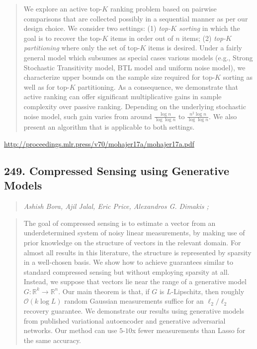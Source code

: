 \documentclass{article}
\begin{document}
\begin{quote}
    We explore an active top-$K$ ranking problem based on pairwise comparisons that are collected possibly in a sequential manner as per our design choice. We consider two settings: (1) \textit{top-$K$ sorting} in which the goal is to recover the top-$K$ items in order out of $n$ items; (2) \textit{top-$K$ partitioning} where only the set of top-$K$ items is desired. Under a fairly general model which subsumes as special cases various models (e.g., Strong Stochastic Transitivity model, BTL model and uniform noise model), we characterize upper bounds on the sample size required for top-$K$ sorting as well as for top-$K$ partitioning. As a consequence, we demonstrate that active ranking can offer significant multiplicative gains in sample complexity over passive ranking. Depending on the underlying stochastic noise model, such gain varies from around $\frac{\log n}{\log \log n}$ to $\frac{ n^2 \log n }{\log \log n}$. We also present an algorithm that is applicable to both settings.  
\end{quote}

\href{http://proceedings.mlr.press/v70/mohajer17a/mohajer17a.pdf}{http://proceedings.mlr.press/v70/mohajer17a/mohajer17a.pdf}

\subsection{249. Compressed Sensing using Generative Models}

\begin{quote}
\footnotesize{\textit{Ashish Bora, Ajil Jalal, Eric Price, Alexandros G. Dimakis ;}}

\end{quote}

\begin{quote}
    The goal of compressed sensing is to estimate a vector from an underdetermined system of noisy linear measurements, by making use of prior knowledge on the structure of vectors in the relevant domain. For almost all results in this literature, the structure is represented by sparsity in a well-chosen basis. We show how to achieve guarantees similar to standard compressed sensing but without employing sparsity at all. Instead, we suppose that vectors lie near the range of a generative model $G: \mathbb{R}^k \to \mathbb{R}^n$. Our main theorem is that, if $G$ is $L$-Lipschitz, then roughly $\mathcal{O}(k \log L)$ random Gaussian measurements suffice for an $\ell_2/\ell_2$ recovery guarantee. We demonstrate our results using generative models from published variational autoencoder and generative adversarial networks. Our method can use $5$-$10$x fewer measurements than Lasso for the same accuracy.  
\end{quote}
\end{document}
